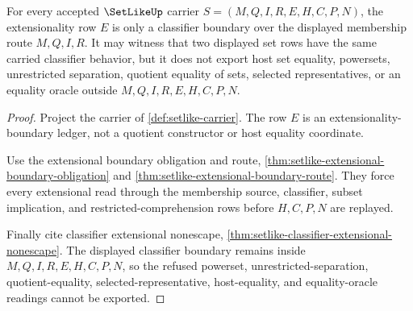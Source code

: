 \begin{theorem}
\label{thm:setlike-extensional-boundary-witness}
For every accepted $\SetLikeUp$ carrier $S=(M,Q,I,R,E,H,C,P,N)$, the extensionality row $E$ is only a classifier boundary over the displayed membership route $M,Q,I,R$. It may witness that two displayed set rows have the same carried classifier behavior, but it does not export host set equality, powersets, unrestricted separation, quotient equality of sets, selected representatives, or an equality oracle outside $M,Q,I,R,E,H,C,P,N$.
\end{theorem}
\begin{proof}
Project the carrier of \autoref{def:setlike-carrier}. The row $E$ is an extensionality-boundary ledger, not a quotient constructor or host equality coordinate.

Use the extensional boundary obligation and route, \autoref{thm:setlike-extensional-boundary-obligation} and \autoref{thm:setlike-extensional-boundary-route}. They force every extensional read through the membership source, classifier, subset implication, and restricted-comprehension rows before $H,C,P,N$ are replayed.

Finally cite classifier extensional nonescape, \autoref{thm:setlike-classifier-extensional-nonescape}. The displayed classifier boundary remains inside $M,Q,I,R,E,H,C,P,N$, so the refused powerset, unrestricted-separation, quotient-equality, selected-representative, host-equality, and equality-oracle readings cannot be exported.
\end{proof}

